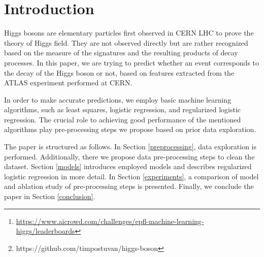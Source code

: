 


\begin{abstract}

Machine learning approaches have become an indispensable part of numerous research fields, providing predictions and explanations of complex multidimensional datasets. In this paper, we focus on developing an approach for detecting whether an event corresponds to the decay of the Higgs boson or not, based on features extracted from the ATLAS experiment performed at CERN. Our best approach uses regularized logistic regression with splitting on the number of jets, feature expansion, median imputing, and outlier bounding. It achieves $83.1\%$ accuracy on the Higgs boson machine learning challenge at AIcrowd platform.\footnote{\hyperlink{AIcrowd}{https://www.aicrowd.com/challenges/epfl-machine-learning-higgs/leaderboards}} The source code of this project is available on GitHub.\footnote{https://github.com/timpostuvan/higgs-boson}

\end{abstract}


\section{Introduction}

Higgs bosons are elementary particles first observed in CERN LHC to prove the theory of Higgs field. They are not observed directly but are rather recognized based on the measure of the signatures and the resulting products of decay processes. In this paper, we are trying to predict whether an event corresponds to the decay of the Higgs boson or not, based on features extracted from the ATLAS experiment performed at CERN.

In order to make accurate predictions, we employ basic machine learning algorithms, such as least squares, logistic regression, and regularized logistic regression. The crucial role to achieving good performance of the mentioned algorithms play pre-processing steps we propose based on prior data exploration.

The paper is structured as follows. In Section \ref{preprocessing}, data exploration is performed. Additionally, there we propose data pre-processing steps to clean the dataset. Section \ref{models} introduces employed models and describes regularized logistic regression in more detail. In Section \ref{experiments}, a comparison of model and ablation study of pre-processing steps is presented. Finally, we conclude the paper in Section \ref{conclusion}. 








